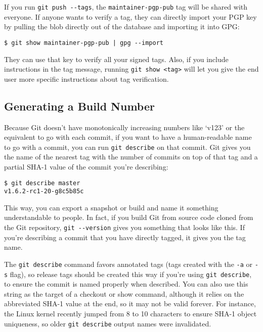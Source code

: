 \documentclass[a4paper]{book}
\newcounter{tab}[chapter]
\begin{document}
If you run \texttt{git push -{}-tags}, the \texttt{maintainer-pgp-pub} tag will be shared with everyone. If anyone wants to verify a tag, they can directly import your PGP key by pulling the blob directly out of the database and importing it into GPG:

\begin{shaded}\begin{verbatim}
$ git show maintainer-pgp-pub | gpg --import
\end{verbatim}\end{shaded}

They can use that key to verify all your signed tags. Also, if you include instructions in the tag message, running \texttt{git show \textless{}tag\textgreater{}} will let you give the end user more specific instructions about tag verification.

\subsection{Generating a Build Number}\label{generating-a-build-number}

Because Git doesn't have monotonically increasing numbers like `v123' or the equivalent to go with each commit, if you want to have a human-readable name to go with a commit, you can run \texttt{git describe} on that commit. Git gives you the name of the nearest tag with the number of commits on top of that tag and a partial SHA-1 value of the commit you're describing:

\begin{shaded}\begin{verbatim}
$ git describe master
v1.6.2-rc1-20-g8c5b85c
\end{verbatim}\end{shaded}

This way, you can export a snapshot or build and name it something understandable to people. In fact, if you build Git from source code cloned from the Git repository, \texttt{git -{}-version} gives you something that looks like this. If you're describing a commit that you have directly tagged, it gives you the tag name.

The \texttt{git describe} command favors annotated tags (tags created with the \texttt{-a} or \texttt{-s} flag), so release tags should be created this way if you're using \texttt{git describe}, to ensure the commit is named properly when described. You can also use this string as the target of a checkout or show command, although it relies on the abbreviated SHA-1 value at the end, so it may not be valid forever. For instance, the Linux kernel recently jumped from 8 to 10 characters to ensure SHA-1 object uniqueness, so older \texttt{git describe} output names were invalidated.
\end{document}
